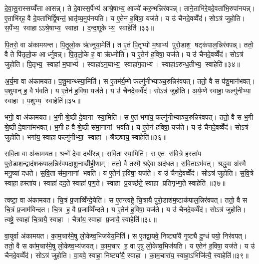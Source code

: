 दे॒वा॒सु॒रास्सय्यँ॑त्ता आसन्न्। ते दे॒वास्स॒र्पेभ्य॑ आश्रे॒षाभ्य॒ आज्ये॑ कर॒म्भन्निर॑वपन्न्। ताने॒ताभि॑रे॒वदे॒वता॑भि॒रुपा॑नयन्न्। ए॒ताभि॑र्‌ह॒ वै दे॒वता॑भिर्द्वि॒षन्तं॒ भ्रातृ॑व्य॒मुप॑नयति। य ए॒तेन॑ ह॒विषा॒ यज॑ते। य उ॑ चैनदे॒वव्वेँद॑। सोऽत्र॑ जुहोति। स॒र्पेभ्य॒ स्वाहाऽऽश्रे॒षाभ्य॒ स्वाहा। द॒न्द॒शूकेभ्य॒ स्वाहेति॑॥३३॥

पि॒तरो॒ वा अ॑कामयन्त। पि॒तृ॒लो॒क ऋ॑ध्नुया॒मेति॑। त ए॒तं पि॒तृभ्यो॑ म॒घाभ्य॑ पुरो॒डाश॒ षट्क॑पाल॒न्निर॑वपन्न्। ततो॒ वै ते पि॑तृलो॒क आर्ध्नुवन्न्। पि॒तृ॒लो॒के ह॒ वा ऋ॑ध्नोति। य ए॒तेन॑ ह॒विषा॒ यज॑ते। य उ॑ चैनदे॒वव्वेँद॑। सोऽत्र॑ जुहोति। पि॒तृभ्य॒ स्वाहा॑ म॒घाभ्य॑। स्वाहा॑ऽन॒घाभ्य॒ स्वाहा॑ग॒दाभ्य॑। स्वाहा॑ऽरुन्ध॒तीभ्य॒ स्वाहेति॑॥३४॥

अ॒र्य॒मा वा अ॑कामयत। प॒शु॒मान्थ्स्या॒मिति॑। स ए॒तम॑र्य॒म्णे फल्गु॑नीभ्याञ्च॒रुन्निर॑वपत्। ततो॒ वै स प॑शु॒मान॑भवत्। प॒शुमान् ह॒ वै भ॑वति। य ए॒तेन॑ ह॒विषा॒ यज॑ते। य उ॑ चैनदे॒वव्वेँद॑। सोऽत्र॑ जुहोति। अ॒र्य॒म्णे स्वाहा॒ फल्गु॑नीभ्या॒ स्वाहा। प॒शुभ्य॒ स्वाहेति॑॥३५॥

भगो॒ वा अ॑कामयत। भ॒गी श्रे॒ष्ठी दे॒वाना स्या॒मिति॑। स ए॒तं भगा॑य॒ फल्गु॑नीभ्याञ्च॒रुन्निर॑वपत्। ततो॒ वै स भ॒गी श्रे॒ष्ठी दे॒वाना॑मभवत्। भ॒गी ह॒ वै श्रे॒ष्ठी स॑मा॒नानां भवति। य ए॒तेन॑ ह॒विषा॒ यज॑ते। य उ॑ चैनदे॒वव्वेँद॑। सोऽत्र॑ जुहोति। भगा॑य॒ स्वाहा॒ फल्गु॑नीभ्या॒ स्वाहा। श्रैष्ठ्या॑य॒ स्वाहेति॑॥३६॥

स॒वि॒ता वा अ॑कामयत। श्रन्मे॑ दे॒वा दधी॑रन्न्। स॒वि॒ता स्या॒मिति॑। स ए॒त स॑वि॒त्रे हस्ता॑य पुरो॒डाश॒न्द्वाद॑शकपाल॒न्निर॑वपदाशू॒नाव्व्रीँ॑ही॒णाम्। ततो॒ वै तस्मै॒ श्रद्दे॒वा अद॑धत। स॒वि॒ताऽभ॑वत्। श्रद्ध॒वा अ॑स्मै मनु॒ष्या॑ दधते। स॒वि॒ता स॑मा॒नानां भवति। य ए॒तेन॑ ह॒विषा॒ यज॑ते। य उ॑ चैनदे॒वव्वेँद॑। सोऽत्र॑ जुहोति। स॒वि॒त्रे स्वाहा॒ हस्ता॑य। स्वाहा॑ दद॒ते स्वाहा॑ पृण॒ते। स्वाहा प्र॒यच्छ॑ते॒ स्वाहा प्रतिगृभ्ण॒ते स्वाहेति॑ ॥३७॥

त्वष्टा॒ वा अ॑कामयत। चि॒त्रं प्र॒जाव्विँ॑न्दे॒येति॑। स ए॒तन्त्वष्ट्रे॑ चि॒त्रायै॑ पुरो॒डाश॑म॒ष्टाक॑पाल॒न्निर॑वपत्। ततो॒ वै स चि॒त्रं प्र॒जाम॑विन्दत। चि॒त्र ह॒ वै प्र॒जाव्विँ॑न्दते। य ए॒तेन॑ ह॒विषा॒ यज॑ते। य उ॑ चैनदे॒वव्वेँद॑। सोऽत्र॑ जुहोति। त्वष्ट्रे॒ स्वाहा॑ चि॒त्रायै॒ स्वाहा। चैत्रा॑य॒ स्वाहा प्र॒जायै॒ स्वाहेति॑॥३८॥

वा॒युर्वा अ॑कामयत। का॒म॒चार॑मे॒षु लो॒केष्व॒भिज॑येय॒मिति॑। स ए॒तद्वा॒यवे॒ निष्ट्या॑यै गृ॒ष्ट्यै दु॒ग्धं पयो॒ निर॑वपत्। ततो॒ वै स का॑म॒चार॑मे॒षु लो॒केष्व॒भ्य॑जयत्। का॒म॒चार ह॒ वा ए॒षु लो॒केष्व॒भिज॑यति। य ए॒तेन॑ ह॒विषा॒ यज॑ते। य उ॑ चैनदे॒वव्वेँद॑। सोऽत्र॑ जुहोति। वा॒यवे॒ स्वाहा॒ निष्ट्या॑यै॒ स्वाहा। का॒म॒चारा॑य॒ स्वाहा॒ऽभिजि॑त्यै॒ स्वाहेति॑॥३९॥

